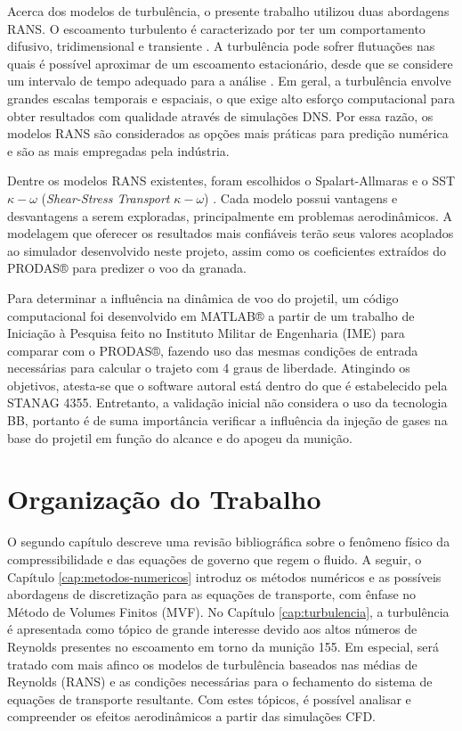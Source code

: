 Acerca dos modelos de turbulência, o presente trabalho utilizou duas abordagens RANS. O escoamento turbulento é caracterizado por ter um comportamento difusivo, tridimensional e transiente \cite{Rezende2009}. A turbulência pode sofrer flutuações nas quais é possível aproximar de um escoamento estacionário, desde que se considere um intervalo de tempo adequado para a análise \cite{Souza2011,SilveiraNeto2002}. Em geral, a turbulência envolve grandes escalas temporais e espaciais, o que exige alto esforço computacional para obter resultados com qualidade através de simulações DNS. Por essa razão, os modelos RANS são considerados as opções mais práticas para predição numérica e são as mais empregadas pela indústria.
	
Dentre os modelos RANS existentes, foram escolhidos o Spalart-Allmaras \cite{Spalart1992} e o SST \(\kappa-\omega\) (\textit{Shear-Stress Transport} \(\kappa-\omega\)) \cite{Menter1994TwoequationET,Menter2003,Menter2009}. Cada modelo possui vantagens e desvantagens a serem exploradas, principalmente em problemas aerodinâmicos. A modelagem que oferecer os resultados mais confiáveis terão seus valores acoplados ao simulador desenvolvido neste projeto, assim como os coeficientes extraídos do PRODAS® para predizer o voo da granada.

Para determinar a influência na dinâmica de voo do projetil, um código computacional foi desenvolvido em MATLAB® a partir de um trabalho de Iniciação à Pesquisa feito no Instituto Militar de Engenharia (IME) \cite{ThallyoENCIT2022,Thallyo2022} para comparar com o PRODAS®, fazendo uso das mesmas condições de entrada necessárias para calcular o trajeto com 4 graus de liberdade. Atingindo os objetivos, atesta-se que o software autoral está dentro do que é estabelecido pela STANAG 4355. Entretanto, a validação inicial não considera o uso da tecnologia BB, portanto é de suma importância verificar a influência da injeção de gases na base do projetil em função do alcance e do apogeu da munição. 

\section{Organização do Trabalho}

O segundo capítulo descreve uma revisão bibliográfica sobre o fenômeno físico da compressibilidade e das equações de governo que regem o fluido. A seguir, o Capítulo \ref{cap:metodos-numericos} introduz os métodos numéricos e as possíveis abordagens de discretização para as equações de transporte, com ênfase no Método de Volumes Finitos (MVF). No Capítulo \ref{cap:turbulencia}, a turbulência é apresentada como tópico de grande interesse devido aos altos números de Reynolds presentes no escoamento em torno da munição \qty{155}{\millimetre}. Em especial, será tratado com mais afinco os modelos de turbulência baseados nas médias de Reynolds (RANS) e as condições necessárias para o fechamento do sistema de equações de transporte resultante. Com estes tópicos, é possível analisar e compreender os efeitos aerodinâmicos a partir das simulações CFD.

